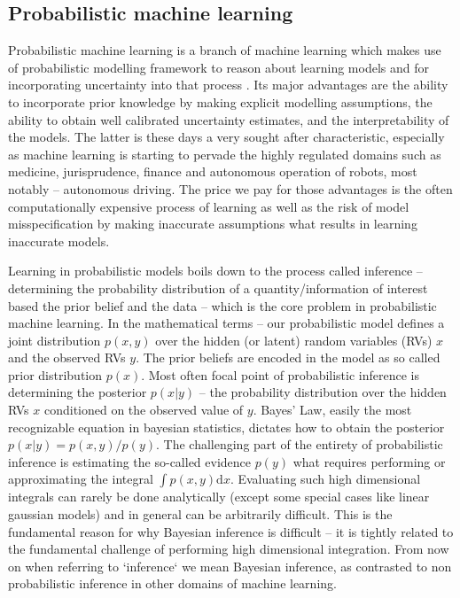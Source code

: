 \documentclass[12pt]{article}
\begin{document}
\subsection{Probabilistic machine learning}
Probabilistic machine learning is a branch of machine learning which makes use of probabilistic modelling framework to reason about learning models and for incorporating uncertainty into that process \citep{Ghahramani2015}.
Its major advantages are the ability to incorporate prior knowledge by making explicit modelling assumptions, the ability to obtain well calibrated uncertainty estimates, and the interpretability of the models.
The latter is these days a very sought after characteristic, especially as machine learning is starting to pervade the highly regulated domains such as medicine, jurisprudence, finance and autonomous operation of robots, most notably -- autonomous driving.
The price we pay for those advantages is the often computationally expensive process of learning as well as the risk of model misspecification by making inaccurate assumptions what results in learning inaccurate models.

Learning in probabilistic models boils down to the process called inference -- determining the probability distribution of a quantity/information of interest based the prior belief and the data -- which is the core problem in probabilistic machine learning.
In the mathematical terms -- our probabilistic model defines a joint distribution $p(x,y)$ over the hidden (or latent) random variables (RVs) $x$ and the observed RVs $y$.
The prior beliefs are encoded in the model as so called prior distribution $p(x)$.
Most often focal point of probabilistic inference is determining the posterior $p(x|y)$ -- the probability distribution over the hidden RVs $x$ conditioned on the observed value of $y$.
Bayes' Law, easily the most recognizable equation in bayesian statistics, dictates how to obtain the posterior $p(x|y) = p(x,y)/p(y)$.
The challenging part of the entirety of probabilistic inference is estimating the so-called evidence $p(y)$ what requires performing or approximating the integral $\int p(x,y) \text{d}x$.
Evaluating such high dimensional integrals can rarely be done analytically (except some special cases like linear gaussian models) and in general can be arbitrarily difficult.
This is the fundamental reason for why Bayesian inference is difficult -- it is tightly related to the fundamental challenge of performing high dimensional integration. 
From now on when referring to `inference` we mean Bayesian inference, as contrasted to non probabilistic inference in other domains of machine learning.
\end{document}

